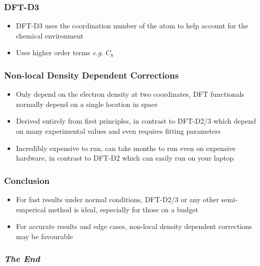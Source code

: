 \documentclass[12pt]{beamer}
\begin{document}
\begin{frame}
  \frametitle{DFT-D3}
  \begin{itemize}
    \item DFT-D3 uses the coordination number of the atom to help account for the chemical environment\footnotemark
    \item Uses higher order terms \emph{e.g.} $C_8$
  \end{itemize}
\end{frame}

\begin{frame}
  \frametitle{Non-local Density Dependent Corrections}
  \begin{itemize}
    \item Only depend on the electron density at two coordinates, DFT functionals normally depend on a single location in space\footnotemark
    \item Derived entirely from first principles, in contrast to DFT-D2/3 which depend on many experimental values and even requires fitting parameters
    \item Incredibly expensive to run, can take months to run even on expensive hardware, in contrast to DFT-D2 which can easily run on your laptop
  \end{itemize}
\end{frame}

\begin{frame}
  \frametitle{Conclusion}
  \begin{itemize}
    \item For fast results under normal conditions, DFT-D2/3 or any other semi-emperical method is ideal, especially for those on a budget
    \item For accurate results and edge cases, non-local density dependent corrections may be favourable
  \end{itemize}
\end{frame}

\begin{frame}
  \frametitle{\emph{The End}}
\end{frame}





\end{document}
